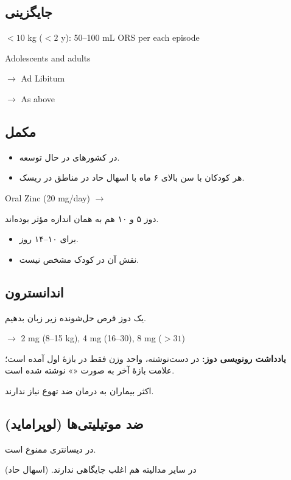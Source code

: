 \documentclass[12pt,a4paper]{article}
\begin{document}
\subsection*{جایگزینی }
\begin{latin}
\( <10 \) kg (\( <2 \) y): 50--100 mL ORS per each episode

Adolescents and adults

\(\longrightarrow\) Ad Libitum

\(\longrightarrow\) As above
\end{latin}

\subsection*{مکمل }
\begin{itemize}
\item در کشورهای در حال توسعه.
\item هر کودکان با سن بالای ۶ ماه با اسهال حاد در مناطق در ریسک.
\end{itemize}
\begin{latin}
Oral Zinc (20 mg/day) \(\longrightarrow\) 
\end{latin}
دوز ۵ و ۱۰ هم به همان اندازه مؤثر بوده‌اند.
\begin{itemize}
\item برای ۱۰–۱۴ روز.
\item نقش آن در کودک  مشخص نیست.
\end{itemize}

\subsection*{اندانسترون}
یک دوز قرص حل‌شونده زیر زبان بدهیم.
\begin{latin}
\(\longrightarrow\) 2 mg (8--15 kg), 4 mg (16--30), 8 mg (\(>31\))
\end{latin}
\textbf{یادداشت رونویسی دوز:} در دست‌نوشته، واحد وزن فقط در بازهٔ اول آمده است؛ علامت بازهٔ آخر به صورت «» نوشته شده است.

اکثر بیماران به درمان ضد تهوع نیاز ندارند.

\subsection*{ضد موتیلیتی‌ها (لوپراماید)}
در دیسانتری ممنوع است.

در سایر مدالیته هم اغلب جایگاهی ندارند. (اسهال حاد)

\clearpage
\end{document}
